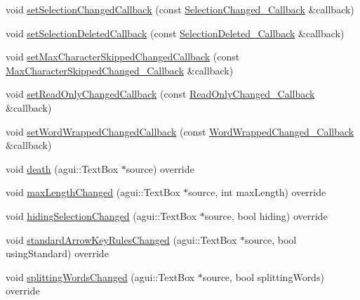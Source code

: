\begin{DoxyCompactItemize}
void \mbox{\hyperlink{classec_1_1_generic_text_box_listener_ae00c8fe6bf39e816e8dd72a93b5dc889}{set\+Selection\+Changed\+Callback}} (const \mbox{\hyperlink{classec_1_1_generic_text_box_listener_a25c554bc062fdfdc805f7aefe981a3ea}{Selection\+Changed\+\_\+\+Callback}} \&callback)
\item 
void \mbox{\hyperlink{classec_1_1_generic_text_box_listener_a187ad507a6a811f3895f4ea79bce8bf4}{set\+Selection\+Deleted\+Callback}} (const \mbox{\hyperlink{classec_1_1_generic_text_box_listener_af2e239586f0259a784148eb5fb3f6b4a}{Selection\+Deleted\+\_\+\+Callback}} \&callback)
\item 
void \mbox{\hyperlink{classec_1_1_generic_text_box_listener_a2fe6e45a08c128b982225fd28fb13bba}{set\+Max\+Character\+Skipped\+Changed\+Callback}} (const \mbox{\hyperlink{classec_1_1_generic_text_box_listener_a43801948fb5a222ba933b085a2f095a3}{Max\+Character\+Skipped\+Changed\+\_\+\+Callback}} \&callback)
\item 
void \mbox{\hyperlink{classec_1_1_generic_text_box_listener_a30cb51d557af4b5fac63dd8787b190a1}{set\+Read\+Only\+Changed\+Callback}} (const \mbox{\hyperlink{classec_1_1_generic_text_box_listener_a2046d1c27dca4b40f4bc373a3ce2be1e}{Read\+Only\+Changed\+\_\+\+Callback}} \&callback)
\item 
void \mbox{\hyperlink{classec_1_1_generic_text_box_listener_ac8f1f1c007e002ad7677e291e44d33dd}{set\+Word\+Wrapped\+Changed\+Callback}} (const \mbox{\hyperlink{classec_1_1_generic_text_box_listener_aa94d95c932df4d70fe03c501520f0d16}{Word\+Wrapped\+Changed\+\_\+\+Callback}} \&callback)
\item 
void \mbox{\hyperlink{classec_1_1_generic_text_box_listener_a11f6063d4c34595db719b4a1c251379b}{death}} (agui\+::\+Text\+Box $\ast$source) override
\item 
void \mbox{\hyperlink{classec_1_1_generic_text_box_listener_a2f35b5eba26dc67175a87632f96651e9}{max\+Length\+Changed}} (agui\+::\+Text\+Box $\ast$source, int max\+Length) override
\item 
void \mbox{\hyperlink{classec_1_1_generic_text_box_listener_a2cb740757cc13929d4ad3a928307960f}{hiding\+Selection\+Changed}} (agui\+::\+Text\+Box $\ast$source, bool hiding) override
\item 
void \mbox{\hyperlink{classec_1_1_generic_text_box_listener_ac57517b272f19eefe4408f4aa5409c55}{standard\+Arrow\+Key\+Rules\+Changed}} (agui\+::\+Text\+Box $\ast$source, bool using\+Standard) override
\item 
void \mbox{\hyperlink{classec_1_1_generic_text_box_listener_a2014c6c0b1c44c2a36d0dbab7cfae7e5}{splitting\+Words\+Changed}} (agui\+::\+Text\+Box $\ast$source, bool splitting\+Words) override

\end{DoxyCompactItemize}
